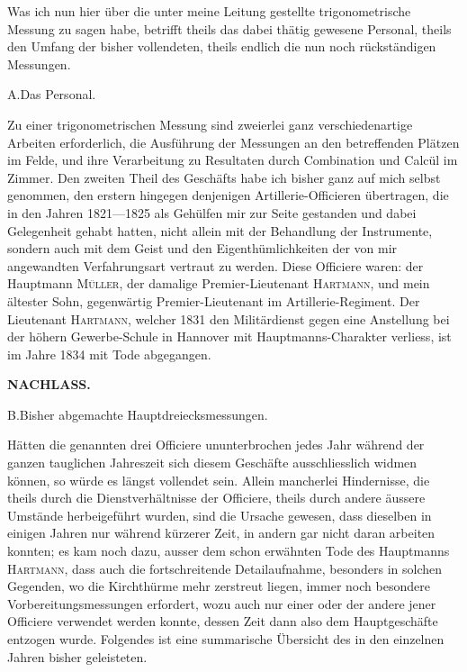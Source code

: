 \par\noindent\hspace*{\parindent}Was ich nun hier über die unter meine Leitung gestellte trigonometrische Messung zu sagen habe, betrifft theils das dabei thätig gewesene Personal, theils den Umfang der bisher vollendeten, theils endlich die nun noch rückständigen Messungen.

\begin{center}
A.\quad Das Personal.
\end{center}

\par\noindent\hspace*{\parindent}Zu einer trigonometrischen Messung sind zweierlei ganz verschiedenartige Arbeiten erforderlich, die Ausführung der Messungen an den betreffenden Plätzen im Felde, und ihre Verarbeitung zu Resultaten durch Combination und Calcül im Zimmer. Den zweiten Theil des Geschäfts habe ich bisher ganz auf mich selbst genommen, den erstern hingegen denjenigen Artillerie-Officieren übertragen, die in den Jahren 1821---1825 als Gehülfen mir zur Seite gestanden und dabei Gelegenheit gehabt hatten, nicht allein mit der Behandlung der Instrumente, sondern auch mit dem Geist und den Eigenthümlichkeiten der von mir angewandten Verfahrungsart vertraut zu werden. Diese Officiere waren: der Hauptmann \textsc{Müller}, der damalige Premier-Lieutenant \textsc{Hartmann}, und mein ältester Sohn, gegenwärtig Premier-Lieutenant im Artillerie-Regiment. Der Lieutenant \textsc{Hartmann}, welcher 1831 den Militärdienst gegen eine Anstellung bei der höhern Gewerbe-Schule in Hannover mit Hauptmanns-Charakter verliess, ist im Jahre 1834 mit Tode abgegangen.

\par\clearpage
\noindent{}\hfill{\small\textbf{NACHLASS.}}\hfill\null\par\medskip

\begin{center}
B.\quad Bisher abgemachte Hauptdreiecksmessungen.
\end{center}

\par\noindent\hspace*{\parindent}Hätten die genannten drei Officiere ununterbrochen jedes Jahr während der ganzen tauglichen Jahreszeit sich diesem Geschäfte ausschliesslich widmen können, so würde es längst vollendet sein. Allein mancherlei Hindernisse, die theils durch die Dienstverhältnisse der Officiere, theils durch andere äussere Umstände herbeigeführt wurden, sind die Ursache gewesen, dass dieselben in einigen Jahren nur während kürzerer Zeit, in andern gar nicht daran arbeiten konnten; es kam noch dazu, ausser dem schon erwähnten Tode des Hauptmanns \textsc{Hartmann}, dass auch die fortschreitende Detailaufnahme, besonders in solchen Gegenden, wo die Kirchthürme mehr zerstreut liegen, immer noch besondere Vorbereitungsmessungen erfordert, wozu auch nur einer oder der andere jener Officiere verwendet werden konnte, dessen Zeit dann also dem Hauptgeschäfte entzogen wurde. Folgendes ist eine summarische Übersicht des in den einzelnen Jahren bisher geleisteten.

